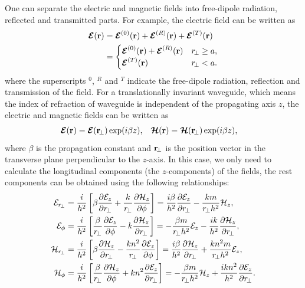 \documentclass[preprint,aps,pra,onecolumn]{revtex4-1} %
\begin{document}
One can separate the electric and magnetic fields into free-dipole radiation, reflected and transmitted parts. For example, the electric field can be written as 
\begin{align}
\boldsymbol{\mathcal{E}}(\mathbf{r}) &= \boldsymbol{\mathcal{E}}^{(0)}(\mathbf{r}) + 
\boldsymbol{\mathcal{E}}^{(R)}(\mathbf{r})+\boldsymbol{\mathcal{E}}^{(T)}(\mathbf{r})\\
&=
	\begin{cases}
	  \boldsymbol{\mathcal{E}}^{(0)} (\mathbf{r})+ \boldsymbol{\mathcal{E}}^{(R)}(\mathbf{r}) & r\!_\perp \geq a,\\
	  \boldsymbol{\mathcal{E}}^{(T)}(\mathbf{r}) & r\!_\perp<a.
	\end{cases} \label{Etotalfiber}
\end{align}
where the superscripts $^0$, $^R$ and $^T$ indicate the free-dipole radiation, reflection and transmission of the field. For a translationally invariant waveguide, which means the index of refraction of waveguide is independent of the propagating axis $z$, the electric and magnetic fields can be written as 
\begin{align}
\boldsymbol{\mathcal{E}}(\mathbf{r}) &= \boldsymbol{\mathcal{E}}(\mathbf{r}\!_\perp)\exp(i\beta z), & \boldsymbol{\mathcal{H}}(\mathbf{r}) &= \boldsymbol{\mathcal{H}}(\mathbf{r}\!_\perp)\exp(i\beta 
z),
\end{align}
where $ \beta $ is the propagation constant and $ \mathbf{r}\!_\perp $ is the position vector in the transverse 
plane perpendicular to the $ z $-axis.
In this case, we only need to calculate the longitudinal components (the $z$-components) of the fields, the rest components can be obtained using the following relationships:
\begin{subequations}\label{EHzgauss}
\begin{align}
\mathcal{E}_{r\!_\perp} &= \frac{i}{h^2} \left[ \beta \pp{\mathcal{E}_z }{r\!_\perp} + 
  \frac{k}{r\!_\perp} 
\pp{\mathcal{H}_z}{\phi} \right]= \frac{i\beta}{h^2} \pp{\mathcal{E}_z }{r\!_\perp} - 
  \frac{km}{r\!_\perp h^2} {\mathcal{H}_z}, \\
\mathcal{E}_\phi &= \frac{i}{h^2} \left[\frac{\beta}{r\!_\perp} 
\pp{\mathcal{E}_z}{\phi} - k 
\pp{\mathcal{H}_z}{r\!_\perp} 
\right] = -\frac{\beta m}{r\!_\perp h^2} 
{\mathcal{E}_z} - \frac{ik}{h^2} 
\pp{\mathcal{H}_z}{r\!_\perp},\\
\mathcal{H}_{r\!_\perp} &= \frac{i}{h^2} \left[ \beta \pp{\mathcal{H}_z}{r\!_\perp} 
- \frac{kn^2}{r\!_\perp}\pp{\mathcal{E}_z}{\phi} \right]= \frac{i\beta}{h^2} \pp{\mathcal{H}_z}{r\!_\perp} 
+ \frac{kn^2m}{r\!_\perp h^2} {\mathcal{E}_z},\\
\mathcal{H}_\phi &= \frac{i}{h^2} \left[ \frac{\beta}{r\!_\perp} \pp{\mathcal{H}_z}{\phi} + 
 kn^2 \pp{\mathcal{E}_z}{r\!_\perp} \right] = -\frac{\beta m}{r\!_\perp h^2} {\mathcal{H}_z} + 
  \frac{ikn^2}{h^2} \pp{\mathcal{E}_z}{r\!_\perp}.
\end{align}
\end{subequations}
\end{document}
